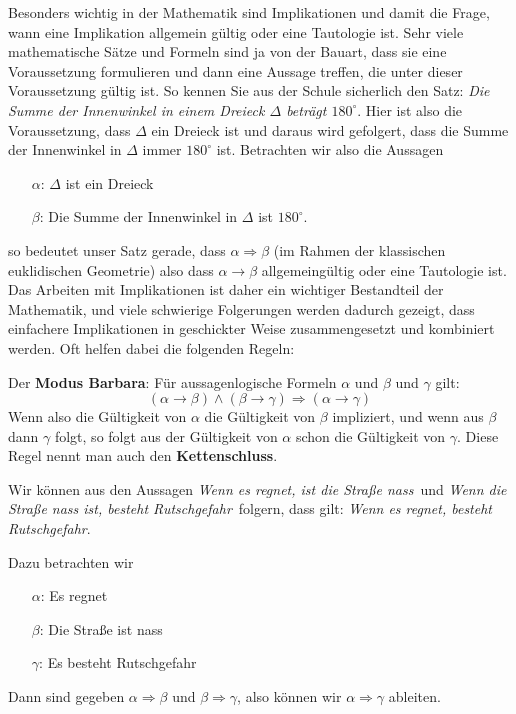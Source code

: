 \bigbreak

Besonders wichtig in der Mathematik sind Implikationen und damit die Frage, wann eine Implikation allgemein 
gültig oder eine Tautologie ist. Sehr viele mathematische Sätze und Formeln sind ja von der Bauart, dass 
sie eine Voraussetzung formulieren und dann eine Aussage treffen, die unter dieser Voraussetzung gültig 
ist. So kennen Sie aus der Schule sicherlich den Satz: \textit{Die Summe der Innenwinkel in einem Dreieck 
$\Delta$ beträgt $180^{\circ}$}. Hier ist also die Voraussetzung, dass $\Delta$ ein Dreieck ist und daraus wird 
gefolgert, dass die Summe der Innenwinkel in $\Delta$ immer $180^{\circ}$ ist. Betrachten wir also die Aussagen

\vspace{-0.2cm}
\begin{itemize}
\item[$\alpha$:] $\Delta$ ist ein Dreieck
\item[$\beta$:] Die Summe der Innenwinkel in $\Delta$ ist $180^{\circ}$.
\end{itemize}

so bedeutet unser Satz gerade, dass $\alpha \Longrightarrow \beta$ (im Rahmen der klassischen 
eu\-kli\-dischen Geometrie) also dass $\alpha \longrightarrow \beta$ allgemeingültig oder eine Tautologie ist. 
Das Arbeiten mit Implikationen ist daher ein wichtiger Bestandteil der Mathematik, und viele schwierige 
Folgerungen werden dadurch gezeigt, dass einfachere Implikationen in geschickter Weise zusammengesetzt und 
kombiniert werden. Oft helfen dabei die folgenden Regeln:

\begin{regel} Der \textbf{Modus Barbara}: Für aussagenlogische Formeln $\alpha$ und $\beta$ und $\gamma$ 
gilt: 
  	$$ (\alpha \rightarrow \beta) \wedge (\beta \rightarrow \gamma) \Longrightarrow (\alpha \rightarrow \gamma) $$
Wenn also die Gültigkeit von $\alpha$ die Gültigkeit von $\beta$ impliziert, und wenn aus $\beta$ dann $\gamma$ 
folgt, so folgt aus der Gültigkeit von  $\alpha$ schon die Gültigkeit von $\gamma$.
Diese Regel nennt man auch den \textbf{Kettenschluss}.
\end{regel}

\begin{beispiel}
Wir können aus den Aussagen 
\textit{Wenn es regnet, ist die Straße nass\,} und \textit{Wenn die Straße nass ist, besteht 
Rutschgefahr\,} folgern, dass gilt: \textit{Wenn es regnet, besteht Rutschgefahr}.

Dazu betrachten wir 

\vspace{-0.3cm}
\begin{itemize}
\item[$\alpha$:] Es regnet
\item[$\beta$:] Die Straße ist nass
\item[$\gamma$:] Es besteht Rutschgefahr
\end{itemize}
\vspace{-0.2cm}
Dann sind gegeben $\alpha \Longrightarrow \beta$ und $\beta \Longrightarrow \gamma$, also können wir 
$\alpha \Longrightarrow \gamma$ ableiten.
\end{beispiel}


